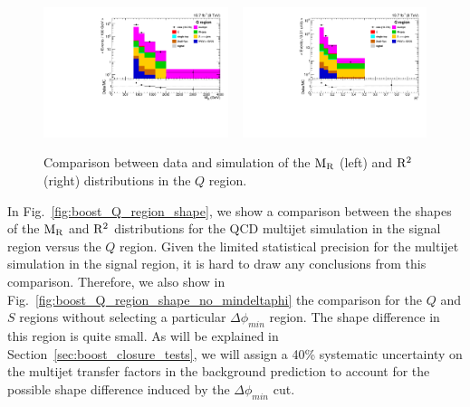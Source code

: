 \begin{figure}[htbp]
\centering
\includegraphics[width=0.48\textwidth]
{figures/razor_selection/plots/DataMC_MR_0Lbg1uW0Ll_mdPhi0p3_width}
~
\includegraphics[width=0.48\textwidth]
{figures/razor_selection/plots/DataMC_R2_0Lbg1uW0Ll_mdPhi0p3_width}
\caption{Comparison between data and simulation of the $\mathrm{M_R}$ (left) and $\mathrm{R^2}$ (right)
distributions in the $Q$ region. 
\label{fig:boost_Q_region_MR_Rsq}}
\end{figure}

% 
% 
% 


In Fig.~\ref{fig:boost_Q_region_shape}, we show a comparison between the shapes of the $\mathrm{M_R}$ and
$\mathrm{R^2}$ distributions for the QCD multijet simulation in the signal region versus the $Q$ region.
Given the limited statistical precision for the multijet simulation in the signal region, it is
hard to draw any conclusions from this comparison. Therefore, we also show in
Fig.~\ref{fig:boost_Q_region_shape_no_mindeltaphi} the comparison for the $Q$ and $S$ regions
without selecting a particular $\Delta\phi_{min}$ region. The shape difference in this
region is quite small. As will be explained in Section~\ref{sec:boost_closure_tests}, we will assign
a 40\% systematic uncertainty on the multijet transfer factors in the background prediction to
account for the possible shape difference induced by the $\Delta\phi_{min}$ cut. 

